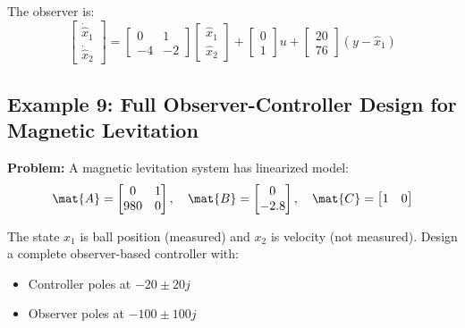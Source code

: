 The observer is:
\begin{equation}
\begin{bmatrix} \dot{\hat{x}}_1 \\ \dot{\hat{x}}_2 \end{bmatrix} =
\begin{bmatrix} 0 & 1 \\ -4 & -2 \end{bmatrix}
\begin{bmatrix} \hat{x}_1 \\ \hat{x}_2 \end{bmatrix} +
\begin{bmatrix} 0 \\ 1 \end{bmatrix} u +
\begin{bmatrix} 20 \\ 76 \end{bmatrix}(y - \hat{x}_1)
\end{equation}

\subsection{Example 9: Full Observer-Controller Design for Magnetic Levitation}

\textbf{Problem:} A magnetic levitation system has linearized model:
\begin{equation}
\mat{A} = \begin{bmatrix} 0 & 1 \\ 980 & 0 \end{bmatrix}, \quad
\mat{B} = \begin{bmatrix} 0 \\ -2.8 \end{bmatrix}, \quad
\mat{C} = \begin{bmatrix} 1 & 0 \end{bmatrix}
\end{equation}

The state $x_1$ is ball position (measured) and $x_2$ is velocity (not measured). Design a complete observer-based controller with:
\begin{itemize}
    \item Controller poles at $-20 \pm 20j$
    \item Observer poles at $-100 \pm 100j$
\end{itemize}

